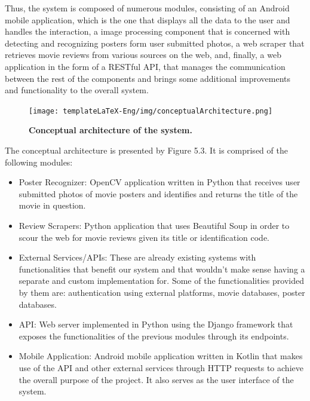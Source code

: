 \documentclass[12pt,a4paper,twoside]{report}
\begin{document}
Thus, the system is composed of numerous modules, consisting of an Android mobile application, which is the one that displays all the data to the user and handles the interaction, a image processing component that is concerned with detecting and recognizing posters form user submitted photos, a web scraper that retrieves movie reviews from various sources on the web, and, finally, a web application in the form of a RESTful API, that manages the communication between the rest of the components and brings some additional improvements and functionality to the overall system.

 \begin{figure}[H]
    \begin{center}
        \texttt{[image: templateLaTeX-Eng/img/conceptualArchitecture.png]}
        \caption{\bf Conceptual architecture of the system.}
    \end{center}
\end{figure}

The conceptual architecture is presented by Figure 5.3. It is comprised of the following modules:
\begin{itemize}
    \item Poster Recognizer: OpenCV application written in Python that receives user submitted photos of movie posters and identifies and returns the title of the movie in question.
    \item Review Scrapers: Python application that uses Beautiful Soup in order to scour the web for movie reviews given its title or identification code.
    \item External Services/APIs: These are already existing systems with functionalities that benefit our system and that wouldn't make sense having a separate and custom implementation for. Some of the functionalities provided by them are: authentication using external platforms, movie databases, poster databases.
    \item API: Web server implemented in Python using the Django framework that exposes the functionalities of the previous modules through its endpoints. 
    \item Mobile Application: Android mobile application written in Kotlin that makes use of the API and other external services through HTTP requests to achieve the overall purpose of the project. It also serves as the user interface of the system.
\end{itemize}

\end{document}
